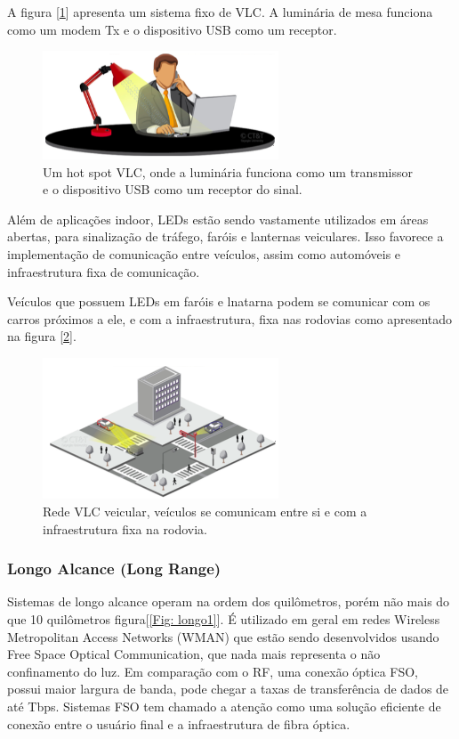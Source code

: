 A figura [\ref{Fig: medio1}] apresenta um sistema fixo de VLC. A luminária de mesa funciona como um modem Tx e o dispositivo USB como um receptor.

\begin{figure}
	\centering
		\includegraphics[width = 7cm]{figuras/medio1}
	\caption{Um hot spot VLC, onde a luminária funciona como um transmissor e o dispositivo USB como um receptor do sinal.}
	\label{Fig: medio1}
\end{figure}

Além de aplicações indoor, LEDs estão sendo vastamente utilizados em áreas abertas, para sinalização de tráfego, faróis e lanternas veiculares. Isso favorece a implementação de comunicação entre veículos, assim como automóveis e infraestrutura fixa de comunicação. \cite{Vehicle}

Veículos que possuem LEDs em faróis e lnatarna podem se comunicar com os carros próximos a ele, e com a infraestrutura, fixa nas rodovias como apresentado na figura [\ref{Fig: medio2}].

\begin{figure}
	\centering
		\includegraphics[width = 7cm]{figuras/medio2}
	\caption{Rede VLC veicular, veículos se comunicam entre si e com a infraestrutura fixa na rodovia.}
	\label{Fig: medio2}
\end{figure}


\subsubsection{Longo Alcance (Long Range)}

Sistemas de longo alcance operam na ordem dos quilômetros, porém não mais do que 10 quilômetros figura[\ref{Fig: longo1}]. É utilizado em geral em redes Wireless Metropolitan Access Networks (WMAN) que estão sendo desenvolvidos usando Free Space Optical Communication, que nada mais representa o não confinamento do luz.
Em comparação com o RF, uma conexão óptica FSO, possui maior largura de banda, pode chegar a taxas de transferência de dados de até Tbps. \cite{g.parcaa.shahpariv.carrozzog.tossia.j.teixeira2008}
Sistemas FSO tem chamado a atenção como uma solução eficiente de conexão entre o usuário final e a infraestrutura de fibra óptica.

